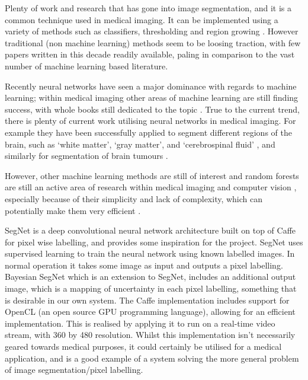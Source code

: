 \documentclass[12pt,twoside,notitlepage]{report}
\begin{document}
        Plenty of work and research that has gone into image segmentation, and it is a common technique used in 
        medical imaging. It can be implemented using a variety of methods such as classifiers, thresholding and region growing
        \cite{pham2000current}. However traditional (non machine learning) methods seem to be loosing traction, with  
        few papers written in this decade readily available, paling in comparison to the vast number of machine learning 
        based literature. 

        Recently neural networks have seen a major dominance with regards to machine learning; within medical 
        imaging other areas of machine learning are still finding success, with whole books still dedicated to the 
        topic \cite{criminisi2013decision}. True to the current trend, there is plenty of current work utilising 
        neural networks in medical imaging. For example they have been successfully applied to segment different 
        regions of the brain, such as `white matter', `gray matter', and `cerebrospinal fluid' \cite{zhao2016segmenting},
        and similarly for segmentation of brain tumours \cite{zhao2016multiscale}.

        However, other machine learning methods are still of interest and random forests are still an active area of 
        research within medical imaging and computer vision \cite{conjeti2016supervised}, especially because of their 
        simplicity and lack of complexity, which can potentially make them very efficient \cite{criminisi2012decision}.

        SegNet \cite{badrinarayanan2015segnet2} is a deep convolutional neural network architecture built on top of Caffe 
        \cite{jia2014caffe} for pixel wise labelling, and provides some inspiration for the project. SegNet uses 
        supervised learning to train the neural network using known labelled images. In normal operation it takes some 
        image as input and outputs a pixel labelling. Bayesian SegNet which is an extension 
        to SegNet, includes an additional output image, which is a mapping of uncertainty in each pixel labelling, 
        something that is desirable in our own system. The Caffe implementation includes support for OpenCL 
        (an open source GPU programming language), allowing for an efficient implementation. This is realised by 
        applying it to run on a real-time video stream, with 360 by 480 resolution. Whilst this implementation isn't 
        necessarily geared towards medical purposes, it could certainly be utilised for a medical application, and 
        is a good example of a system solving the more general problem of image segmentation/pixel labelling.
\end{document}
